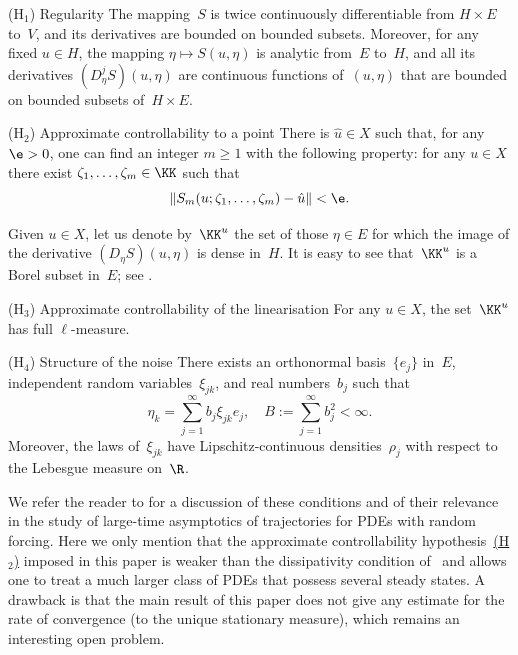 \begin{enonce*}{\hypertarget{H1}{(H$_1$)} Regularity}
The mapping~$S$ is twice continuously differentiable from $H\times E$ to~$V$, and its derivatives are bounded on bounded subsets. Moreover, for any fixed $u\in H$, the mapping $\eta\mapsto S(u,\eta)$ is analytic from~$E$ to~$H$, and all its derivatives $(D_\eta^jS)(u,\eta)$ are continuous functions of~$(u,\eta)$ that are bounded on bounded subsets of~$H\times E$.
\end{enonce*}

\begin{enonce*}{\hypertarget{H2}{(H$_2$)} Approximate controllability to a point}
There is $\hat u\in X$ such that, for any $\e>0$, one can find an integer $m\ge1$ with the following property: for any $u\in X$ there exist $\zeta_1,\dots,\zeta_m\in\KK$ such that
\begin{equation} \label{1.2}
\|S_m(u;\zeta_1,\dots,\zeta_m)-\hat u\|<\e.
\end{equation}
\end{enonce*}

Given $u\in X$, let us denote by~$\KK^u$ the set of those $\eta\in E$ for which the image of the derivative $(D_\eta S)(u,\eta)$ is dense in~$H$. It is easy to see that~$\KK^u$ is a Borel subset in~$E$; see \cite[\S1.1]{KNS-2020}.

\begin{enonce*}{\hypertarget{H3}{(H$_3$)} Approximate controllability of the linearisation}
For any $u\in X$, the set~$\KK^u$ has full $\ell$-measure.
\end{enonce*}

\begin{enonce*}{\hypertarget{H4}{(H$_4$)} Structure of the noise}
There exists an orthonormal basis~$\{e_j\}$ in~$E$, independent random variables~$\xi_{jk}$, and real numbers~$b_j$ such that
\begin{equation} \label{1.3}
\eta_k=\sum_{j=1}^\infty b_j\xi_{jk}e_j,\quad B:=\sum_{j=1}^\infty b_j^2<\infty.
\end{equation}
Moreover, the laws of~$\xi_{jk}$ have Lipschitz-continuous densities~$\rho_j$ with respect to the Lebesgue measure on~$\R$.
\end{enonce*}

We refer the reader to \cite[\S1.1]{KNS-2020} for a discussion of these conditions and of their relevance in the study of large-time asymptotics of trajectories for PDEs with random forcing. Here we only mention that the approximate controllability hypothesis~\hyperlink{H2}{(H$_2$)} imposed in this paper is weaker than the dissipativity condition of~\cite{KNS-2020} and allows one to treat a much larger class of PDEs that possess several steady states. A drawback is that the main result of this paper does not give any estimate for the rate of convergence (to the unique stationary measure), which remains an interesting open problem.

